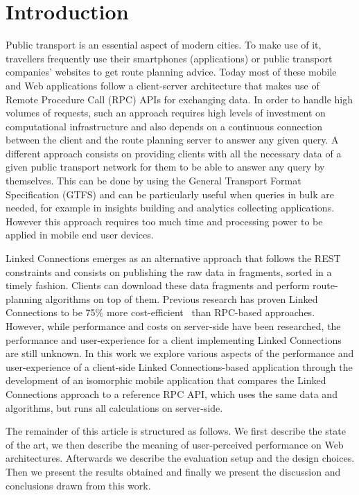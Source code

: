 \documentclass[twocolumn]{phdsymp} %
\begin{document}
\section{Introduction}
 Public transport is an essential aspect of modern cities. To make use of it, travellers frequently use their smartphones (applications) or public transport companies' websites to get route planning advice. Today most of these mobile and Web applications follow a client-server architecture that makes use of Remote Procedure Call (RPC) APIs for exchanging data. In order to handle high volumes of requests, such an approach requires high levels of investment on computational infrastructure and also depends on a continuous connection between the client and the route planning server to answer any given query. A different approach consists on providing clients with all the necessary data of a given public transport network for them to be able to answer any query by themselves. This can be done by using the General Transport Format Specification (GTFS) and can be particularly useful when queries in bulk are needed, for example in insights building and analytics collecting applications. However this approach requires too much time and processing power to be applied in mobile end user devices.

Linked Connections emerges as an alternative approach that follows the REST constraints and consists on publishing the raw data in fragments, sorted in a timely fashion. Clients can download these data fragments and perform route-planning algorithms on top of them. Previous research has proven Linked Connections to be 75\% more cost-efficient~\cite{colpaert17} than \textsc{RPC}-based approaches. However, while performance and costs on server-side have been researched, the performance and user-experience for a client implementing Linked Connections are still unknown. In this work we explore various aspects of the performance and user-experience of a client-side Linked Connections-based application through the development of an isomorphic mobile application that compares the Linked Connections approach to a reference \textsc{RPC} API, which uses the same data and algorithms, but runs all calculations on server-side.

The remainder of this article is structured as follows. We first describe the state of the art, we then describe the meaning of user-perceived performance on Web architectures. Afterwards we describe the evaluation setup and the design choices. Then we present the results obtained and finally we present the discussion and conclusions drawn from this work.
\end{document}
